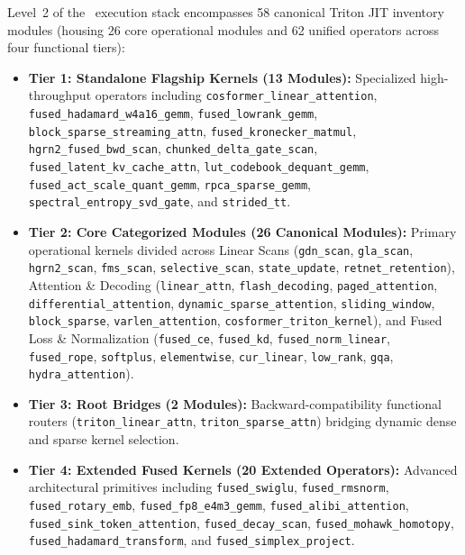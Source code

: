 Level~2 of the \neuralops\ execution stack encompasses 58 canonical Triton JIT inventory modules (housing 26 core operational modules and 62 unified operators across four functional tiers):
\begin{itemize}
    \item \textbf{Tier 1: Standalone Flagship Kernels (13 Modules):} Specialized high-throughput operators including \texttt{cosformer\_linear\_attention}, \texttt{fused\_hadamard\_w4a16\_gemm}, \texttt{fused\_lowrank\_gemm}, \texttt{block\_sparse\_streaming\_attn}, \texttt{fused\_kronecker\_matmul}, \texttt{hgrn2\_fused\_bwd\_scan}, \texttt{chunked\_delta\_gate\_scan}, \texttt{fused\_latent\_kv\_cache\_attn}, \texttt{lut\_codebook\_dequant\_gemm}, \texttt{fused\_act\_scale\_quant\_gemm}, \texttt{rpca\_sparse\_gemm}, \texttt{spectral\_entropy\_svd\_gate}, and \texttt{strided\_tt}.
    \item \textbf{Tier 2: Core Categorized Modules (26 Canonical Modules):} Primary operational kernels divided across Linear Scans (\texttt{gdn\_scan}, \texttt{gla\_scan}, \texttt{hgrn2\_scan}, \texttt{fms\_scan}, \texttt{selective\_scan}, \texttt{state\_update}, \texttt{retnet\_retention}), Attention \& Decoding (\texttt{linear\_attn}, \texttt{flash\_decoding}, \texttt{paged\_attention}, \texttt{differential\_attention}, \texttt{dynamic\_sparse\_attention}, \texttt{sliding\_window}, \texttt{block\_sparse}, \texttt{varlen\_attention}, \texttt{cosformer\_triton\_kernel}), and Fused Loss \& Normalization (\texttt{fused\_ce}, \texttt{fused\_kd}, \texttt{fused\_norm\_linear}, \texttt{fused\_rope}, \texttt{softplus}, \texttt{elementwise}, \texttt{cur\_linear}, \texttt{low\_rank}, \texttt{gqa}, \texttt{hydra\_attention}).
    \item \textbf{Tier 3: Root Bridges (2 Modules):} Backward-compatibility functional routers (\texttt{triton\_linear\_attn}, \texttt{triton\_sparse\_attn}) bridging dynamic dense and sparse kernel selection.
    \item \textbf{Tier 4: Extended Fused Kernels (20 Extended Operators):} Advanced architectural primitives including \texttt{fused\_swiglu}, \texttt{fused\_rmsnorm}, \texttt{fused\_rotary\_emb}, \texttt{fused\_fp8\_e4m3\_gemm}, \texttt{fused\_alibi\_attention}, \texttt{fused\_sink\_token\_attention}, \texttt{fused\_decay\_scan}, \texttt{fused\_mohawk\_homotopy}, \texttt{fused\_hadamard\_transform}, and \texttt{fused\_simplex\_project}.
\end{itemize}

